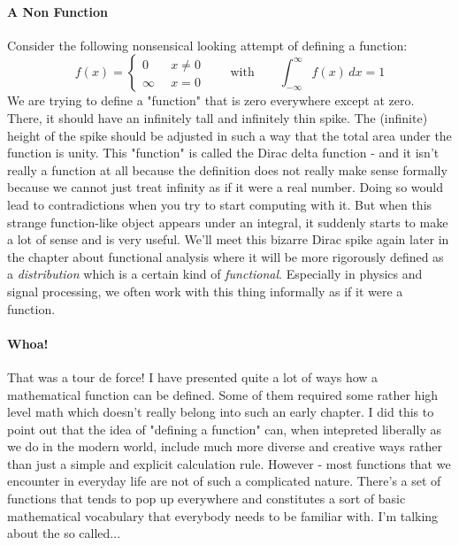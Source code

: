 \paragraph{A Non Function}
Consider the following nonsensical looking attempt of defining a function:
\begin{equation}
f(x) = 
\begin{cases} 
0       \quad& x \neq 0 \\
\infty       & x = 0
\end{cases} \qquad \text{with} \qquad
\int_{-\infty}^{\infty} f(x) \, dx = 1
\end{equation}
We are trying to define a "function" that is zero everywhere except at zero. There, it should have an infinitely tall and infinitely thin spike. The (infinite) height of the spike should be adjusted in such a way that the total area under the function is unity. This "function" is called the Dirac delta function - and it isn't really a function at all because the definition does not really make sense formally because we cannot just treat infinity as if it were a real number. Doing so would lead to contradictions when you try to start computing with it. But when this strange function-like object appears under an integral, it suddenly starts to make a lot of sense and is very useful. We'll meet this bizarre Dirac spike again later in the chapter about functional analysis where it will be more rigorously defined as a \emph{distribution} which is a certain kind of \emph{functional}. Especially in physics and signal processing, we often work with this thing informally as if it were a function.



\paragraph{Whoa!} That was a tour de force! I have presented quite a lot of ways how a mathematical function can be defined. Some of them required some rather high level math which doesn't really belong into such an early chapter. I did this to point out that the idea of "defining a function" can, when intepreted liberally as we do in the modern world, include much more diverse and creative ways rather than just a simple and explicit calculation rule. However - most functions that we encounter in everyday life are not of such a complicated nature. There's a set of functions that tends to pop up everywhere and constitutes a sort of basic mathematical vocabulary that everybody needs to be familiar with. I'm talking about the so called...

